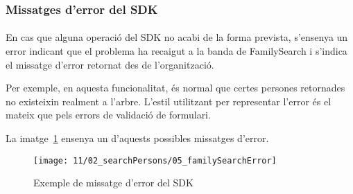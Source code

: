 \subsubsection{Missatges d'error del SDK}

\paragraph{}
En cas que alguna operació del SDK no acabi de la forma prevista, s'ensenya un error indicant que el problema ha recaigut a la banda de FamilySearch i s’indica el missatge d’error retornat des de l’organització.

Per exemple, en aquesta funcionalitat, és normal que certes persones retornades no existeixin realment a l'arbre. L'estil utilitzant per representar l'error és el mateix que pels errors de validació de formulari.

La imatge~\ref{fig:fsError} ensenya un d’aquests possibles missatges d’error.

\begin{figure}[h]
    \texttt{[image: 11/02\_searchPersons/05\_familySearchError]}
    \centering
    \caption{Exemple de missatge d'error del SDK}\label{fig:fsError}
\end{figure}
